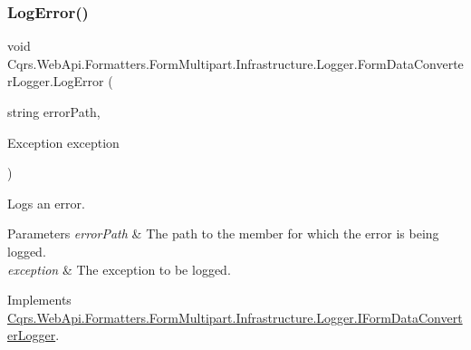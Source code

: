 \mbox{\label{classCqrs_1_1WebApi_1_1Formatters_1_1FormMultipart_1_1Infrastructure_1_1Logger_1_1FormDataConverterLogger_ab54b4f24cc7ee7eacddbb9900a832ca3_ab54b4f24cc7ee7eacddbb9900a832ca3}} 
\subsubsection{\texorpdfstring{Log\+Error()}{LogError()}\hspace{0.1cm}{\footnotesize\ttfamily [1/2]}}
{\footnotesize\ttfamily void Cqrs.\+Web\+Api.\+Formatters.\+Form\+Multipart.\+Infrastructure.\+Logger.\+Form\+Data\+Converter\+Logger.\+Log\+Error (\begin{DoxyParamCaption}\item[{string}]{error\+Path,  }\item[{Exception}]{exception }\end{DoxyParamCaption})}



Logs an error. 


\begin{DoxyParams}{Parameters}
{\em error\+Path} & The path to the member for which the error is being logged.\\
\hline
{\em exception} & The exception to be logged.\\
\hline
\end{DoxyParams}


Implements \hyperlink{interfaceCqrs_1_1WebApi_1_1Formatters_1_1FormMultipart_1_1Infrastructure_1_1Logger_1_1IFormDataConverterLogger_a7da0b7749a50f6fed2cb5ab0d8efef2a_a7da0b7749a50f6fed2cb5ab0d8efef2a}{Cqrs.\+Web\+Api.\+Formatters.\+Form\+Multipart.\+Infrastructure.\+Logger.\+I\+Form\+Data\+Converter\+Logger}.

